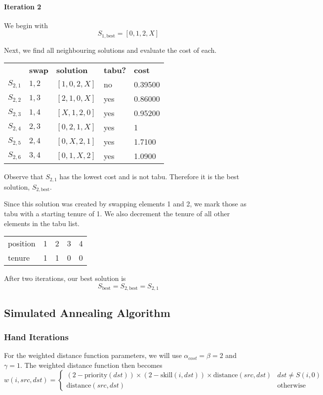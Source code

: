 \documentclass[a4paper]{article}
\newcommand{\subsubsubsection}[1]{\paragraph{#1} \mbox{}}
\begin{document}
\subsubsubsection{Iteration 2}

We begin with $$S_{1, \text{best}} = [0, 1, 2, X]$$

Next, we find all neighbouring solutions and evaluate the cost of each.

\begin{tabular}{lllll}
& \textbf{swap}   & \textbf{solution}    & \textbf{tabu?} & \textbf{cost}  \\

$S_{2,1}$ & $1,2$ & $[1, 0, 2, X]$ & no  & 0.39500 \\
$S_{2,2}$ & $1,3$ & $[2, 1, 0, X]$ & yes & 0.86000 \\
$S_{2,3}$ & $1,4$ & $[X, 1, 2, 0]$ & yes & 0.95200 \\
$S_{2,4}$ & $2,3$ & $[0, 2, 1, X]$ & yes & 1       \\
$S_{2,5}$ & $2,4$ & $[0, X, 2, 1]$ & yes & 1.7100  \\
$S_{2,6}$ & $3,4$ & $[0, 1, X, 2]$ & yes & 1.0900  \\
\end{tabular}

Observe that $S_{2,1}$ has the lowest cost and is not tabu. Therefore it is the best solution, $S_{2, \text{best}}$.

Since this solution was created by swapping elements 1 and 2, we mark those as tabu with a starting tenure of 1. We also decrement the tenure of all other elements in the tabu list.

\begin{tabular}{lllll}
position & 1 & 2 & 3 & 4 \\
tenure   & 1 & 1 & 0 & 0
\end{tabular}
\vspace{1.5em}

After two iterations, our best solution is
$$S_{\text{best}} = S_{2, \text{best}} = S_{2,1}$$

\subsection{Simulated Annealing Algorithm} %

\subsubsection{Hand Iterations}

For the weighted distance function parameters, we will use $\alpha_{cost} = \beta = 2$ and $\gamma = 1$. The weighted distance function then becomes
$$
w(i, \mathit{src}, \mathit{dst}) = \begin{cases}
(2 - \text{priority}(\mathit{dst})) \times (2 - \text{skill}(i, \mathit{dst})) \times \text{distance}(\mathit{src}, \mathit{dst}) & \mathit{dst} \ne S(i,0) \\
\text{distance}(\mathit{src}, \mathit{dst}) & \text{otherwise}
\end{cases}
$$
\end{document}
